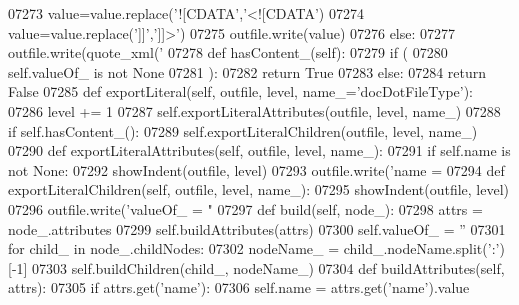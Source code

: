 \begin{DoxyCode}
{{{{{{{{{{{{{{{{{{{{{{{{{{{{{{{{{{{{{{{{{{{{{{{{{{{{{{{{{{{{{{{{{{{{{{{{{{{{{{{{{{{{{{{{{{{{{{{{{{{{{{{{{{{{{{{{{{{{{{{{{{{{{{{{{{{{{{{{{{{{{{{{{{{{{{{{{{{{{{{{{{{{{{{{{{{{{{{{{{{{{{{{{{{{{{{{{{{{{{{{{{{{{{{{{{{{{{{{{{{{{{{{{{{{{{{{{{{{{{{{{{{{{{{{{{{{{{{{{{{{{{{{{{{{{{{{{{{{{{{{{{{{{{{{{{{{{{{{{{{{{{{{{{{{{{{{{{{{{{{{{{{{{{{{{{{{{{{{{{{{{{{{{{{{{{{{{{{{{{{{{{{{{{{{{{{{{{{{{{{{{{{{{{{{{{{{{{{{{{{{{{{{{{{{{{{{{{{{{{{{{{{{{{{{{{{{{{{{{{{{{{{{{{{{{{{{{{{{{{07273             value=value.replace(\textcolor{stringliteral}{'![CDATA'},\textcolor{stringliteral}{'<![CDATA'})
07274             value=value.replace(\textcolor{stringliteral}{']]'},\textcolor{stringliteral}{']]>'})
07275             outfile.write(value)
07276         \textcolor{keywordflow}{else}:
07277             outfile.write(quote_xml(\textcolor{stringliteral}{'%
07278     \textcolor{keyword}{def }hasContent_(self):
07279         \textcolor{keywordflow}{if} (
07280             self.valueOf_ \textcolor{keywordflow}{is} \textcolor{keywordflow}{not} \textcolor{keywordtype}{None}
07281             ):
07282             \textcolor{keywordflow}{return} \textcolor{keyword}{True}
07283         \textcolor{keywordflow}{else}:
07284             \textcolor{keywordflow}{return} \textcolor{keyword}{False}
07285     \textcolor{keyword}{def }exportLiteral(self, outfile, level, name\_='docDotFileType'):
07286         level += 1
07287         self.exportLiteralAttributes(outfile, level, name\_)
07288         \textcolor{keywordflow}{if} self.hasContent_():
07289             self.exportLiteralChildren(outfile, level, name\_)
07290     \textcolor{keyword}{def }exportLiteralAttributes(self, outfile, level, name\_):
07291         \textcolor{keywordflow}{if} self.name \textcolor{keywordflow}{is} \textcolor{keywordflow}{not} \textcolor{keywordtype}{None}:
07292             showIndent(outfile, level)
07293             outfile.write(\textcolor{stringliteral}{'name = %
07294     \textcolor{keyword}{def }exportLiteralChildren(self, outfile, level, name\_):
07295         showIndent(outfile, level)
07296         outfile.write(\textcolor{stringliteral}{'valueOf\_ = "%
07297     \textcolor{keyword}{def }build(self, node\_):
07298         attrs = node\_.attributes
07299         self.buildAttributes(attrs)
07300         self.valueOf_ = \textcolor{stringliteral}{''}
07301         \textcolor{keywordflow}{for} child\_ \textcolor{keywordflow}{in} node\_.childNodes:
07302             nodeName\_ = child\_.nodeName.split(\textcolor{stringliteral}{':'})[-1]
07303             self.buildChildren(child\_, nodeName\_)
07304     \textcolor{keyword}{def }buildAttributes(self, attrs):
07305         \textcolor{keywordflow}{if} attrs.get(\textcolor{stringliteral}{'name'}):
07306             self.name = attrs.get(\textcolor{stringliteral}{'name'}).value
}}}}}}}}}}}}}}}}}}}}}}}}}}}}}}}}}}}}}}}}}}}}}}}}}}}}}}}}}}}}}}}}}}}}}}}}}}}}}}}}}}}}}}}}}}}}}}}}}}}}}}}}}}}}}}}}}}}}}}}}}}}}}}}}}}}}}}}}}}}}}}}}}}}}}}}}}}}}}}}}}}}}}}}}}}}}}}}}}}}}}}}}}}}}}}}}}}}}}}}}}}}}}}}}}}}}}}}}}}}}}}}}}}}}}}}}}}}}}}}}}}}}}}}}}}}}}}}}}}}}}}}}}}}}}}}}}}}}}}}}}}}}}}}}}}}}}}}}}}}}}}}}}}}}}}}}}}}}}}}}}}}}}}}}}}}}}}}}}}}}}}}}}}}}}}}}}}}}}}}}}}}}}}}}}}}}}}}}}}}}}}}}}}}}}}}}}}}}}}}}}}}}}}}}}}}}}}}}}}}}}}}}}}}}}}}}}}}}}}}}}}}}}}}}}}}}}}}}}}}}}
\end{DoxyCode}

